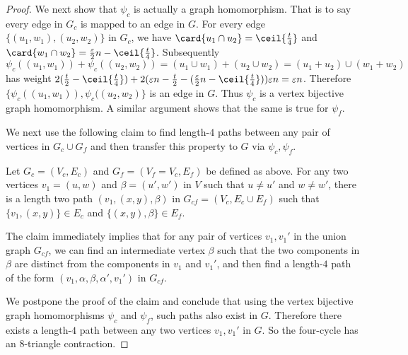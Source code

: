 \begin{proof}
    We next show that $\psi_c$ is actually a graph homomorphism. That is to say every edge in $G_c$ is mapped to an edge in $G$.
    For every edge \(\{(u_1,w_1),(u_2,w_2)\}\) in $G_c$, we have \(\card{u_1\cap u_2} = \ceil{\frac{t}{4}}\) and \(\card{w_1\cap w_2} =\frac{\varepsilon}{2}n-\ceil{\frac{t}{4}}\). Subsequently 
    \[\psi_c((u_1, w_1)) + \psi_c((u_2, w_2)) = (u_1\cup w_1)+(u_2\cup w_2) = (u_1+u_2)\cup(w_1+w_2)  \]
    has weight \(2(\frac{t}{2}-\ceil{\frac{t}{4}}) + 2 ( \varepsilon n-\frac{t}{2}- (\frac{\varepsilon}{2}n-\ceil{\frac{t}{4}}))\varepsilon n = \varepsilon n\). Therefore $\{\psi_c((u_1, w_1)), \psi_c((u_2, w_2)\}$ is an edge in \(G\). Thus $\psi_c$ is a vertex bijective graph homomorphism. A similar argument shows that the same is true for $\psi_f$.

    We next use the following claim to find length-$4$ paths between any pair of vertices in $G_c \cup G_f$ and then transfer this property to $G$ via $\psi_c,\psi_f$.
    \begin{claim}\label{claim:2-step-Johnson}
        Let $G_c = (V_c,E_c)$ and $G_f = (V_f=V_c,E_f)$ be defined as above.
        For any two vertices $v_1 = (u,w)$ and $\beta =(u',w')$ in $V$ such that $u\neq u'$ and $w \neq w'$, there is a length two path $(v_1,(x,y),\beta)$ in $G_{cf}=(V_c,E_c\cup E_f)$ such that $\{v_1,(x,y)\} \in E_c$ and $\{(x,y),\beta\} \in E_f$.
    \end{claim}
    The claim immediately implies that for any pair of vertices $v_1,v_1'$ in the union graph $G_{cf}$, we can find an intermediate vertex $\beta$ such that the two components in $\beta$ are distinct from the components in $v_1$ and $v_1'$, and then find a length-$4$ path of the form $(v_1,\alpha,\beta,\alpha',v_1')$ in $G_{cf}$.
    
    We postpone the proof of the claim and conclude that using the vertex bijective graph homomorphisms $\psi_c$ and $\psi_f$, such paths also exist in $G$. Therefore there exists a length-$4$ path between any two vertices $v_1,v_1'$ in $G$. So the four-cycle has an $8$-triangle contraction.
\end{proof}
